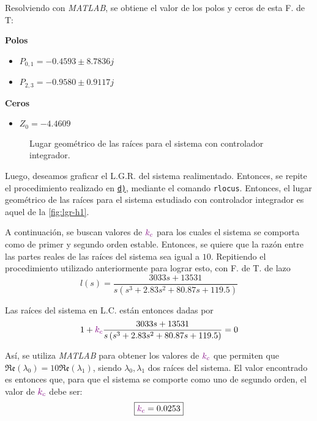 Resolviendo con \textit{MATLAB}, se obtiene el valor de los polos y ceros de esta F. de T:

\begin{multicols}{2}
    \textbf{Polos}
    \begin{itemize}
        \item \(P_{0,1} = -0.4593 \pm 8.7836j\)
        \item \(P_{2,3} = -0.9580 \pm 0.9117j\)
    \end{itemize}

    \columnbreak

    \textbf{Ceros}
    \begin{itemize}
        \item \(Z_0 = -4.4609\)
    \end{itemize}
\end{multicols}

\begin{figure}[ht]
    \centering
    
    \caption{Lugar geométrico de las raíces para el sistema con controlador integrador.}
    \label{fig:lgr-h1}
\end{figure}

Luego, deseamos graficar el L.G.R. del sistema realimentado. Entonces, se repite
el procedimiento realizado en \hyperref[pregunta-d]{\texttt{d)}}, mediante el
comando \verb|rlocus|. Entonces, el lugar geométrico de las raíces para el sistema
estudiado con controlador integrador es aquel de la \autoref{fig:lgr-h1}.

A continuación, se buscan valores de $\mathbin{\color{violet}k_{c}}$ para los cuales el sistema se
comporta como de primer y segundo orden estable. Entonces, se quiere que la razón
entre las partes reales de las raíces del sistema sea igual a $10$. Repitiendo
el procedimiento utilizado anteriormente para lograr esto, con F. de T. de lazo
\begin{equation}
    l(s) = \frac{3033s + 13531}{s\left(s^{3} + 2.83s^{2} + 80.87s + 119.5\right)}
\end{equation}

Las raíces del sistema en L.C. están entonces dadas por
\begin{equation}
    1 + \mathbin{\color{violet}k_{c}}\frac{3033s + 13531}{s\left(s^{3} + 2.83s^{2} + 80.87s + 119.5\right)} = 0
\end{equation}

Así, se utiliza \textit{MATLAB} para obtener los valores de $\mathbin{\color{violet}k_{c}}$ que
permiten que $\mathfrak{Re}(\lambda_{0}) = 10\mathfrak{Re}(\lambda_{1})$, siendo
$\lambda_{0}, \lambda_{1}$ dos raíces del sistema. El valor encontrado es entonces
que, para que el sistema se comporte como uno de segundo orden, el valor de
$\mathbin{\color{violet}k_{c}}$ debe ser:
\begin{equation}
    \boxed{\mathbin{\color{violet}k_{c}} = 0.0253}
\end{equation}


